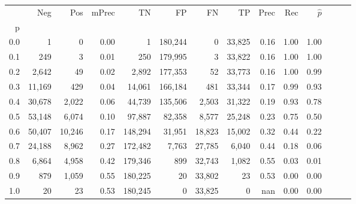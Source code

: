 \begin{tabular}{rrrrrrrrrrrrrr}
\toprule
{} &     Neg &     Pos & mPrec &       TN &       FP &      FN &      TP &  Prec &   Rec & $\hat{p}$ \\
p   &         &         &       &          &          &         &         &       &       &           \\
\midrule
0.0 &       1 &       0 &  0.00 &        1 &  180,244 &       0 &  33,825 &  0.16 &  1.00 &      1.00 \\
0.1 &     249 &       3 &  0.01 &      250 &  179,995 &       3 &  33,822 &  0.16 &  1.00 &      1.00 \\
0.2 &   2,642 &      49 &  0.02 &    2,892 &  177,353 &      52 &  33,773 &  0.16 &  1.00 &      0.99 \\
0.3 &  11,169 &     429 &  0.04 &   14,061 &  166,184 &     481 &  33,344 &  0.17 &  0.99 &      0.93 \\
0.4 &  30,678 &   2,022 &  0.06 &   44,739 &  135,506 &   2,503 &  31,322 &  0.19 &  0.93 &      0.78 \\
0.5 &  53,148 &   6,074 &  0.10 &   97,887 &   82,358 &   8,577 &  25,248 &  0.23 &  0.75 &      0.50 \\
0.6 &  50,407 &  10,246 &  0.17 &  148,294 &   31,951 &  18,823 &  15,002 &  0.32 &  0.44 &      0.22 \\
0.7 &  24,188 &   8,962 &  0.27 &  172,482 &    7,763 &  27,785 &   6,040 &  0.44 &  0.18 &      0.06 \\
0.8 &   6,864 &   4,958 &  0.42 &  179,346 &      899 &  32,743 &   1,082 &  0.55 &  0.03 &      0.01 \\
0.9 &     879 &   1,059 &  0.55 &  180,225 &       20 &  33,802 &      23 &  0.53 &  0.00 &      0.00 \\
1.0 &      20 &      23 &  0.53 &  180,245 &        0 &  33,825 &       0 &   nan &  0.00 &      0.00 \\
\bottomrule
\end{tabular}
